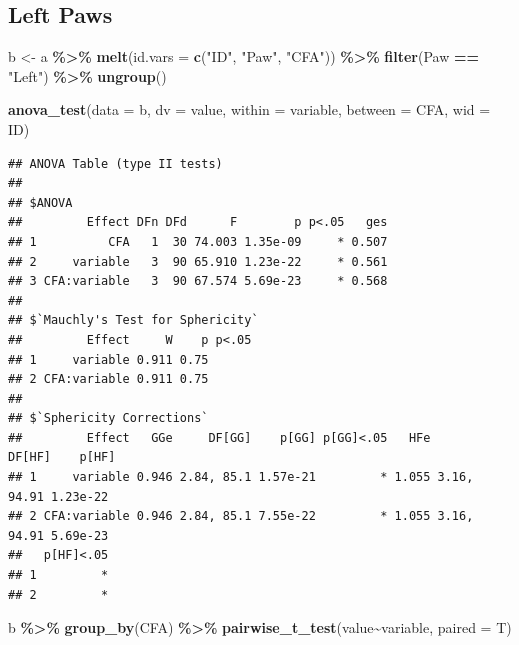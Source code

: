 \documentclass[
]{book}
\newenvironment{Shaded}{\begin{snugshade}}{\end{snugshade}}
\newcommand{\AttributeTok}[1]{\textcolor[rgb]{0.13,0.29,0.53}{#1}}
\newcommand{\FunctionTok}[1]{\textcolor[rgb]{0.13,0.29,0.53}{\textbf{#1}}}
\newcommand{\NormalTok}[1]{#1}
\newcommand{\OtherTok}[1]{\textcolor[rgb]{0.56,0.35,0.01}{#1}}
\newcommand{\SpecialCharTok}[1]{\textcolor[rgb]{0.81,0.36,0.00}{\textbf{#1}}}
\newcommand{\StringTok}[1]{\textcolor[rgb]{0.31,0.60,0.02}{#1}}
\begin{document}
\subsection*{Left Paws}\label{left-paws-2}

\begin{Shaded}
\begin{Highlighting}[]
\NormalTok{b }\OtherTok{\textless{}{-}}\NormalTok{ a  }\SpecialCharTok{\%\textgreater{}\%}
  \FunctionTok{melt}\NormalTok{(}\AttributeTok{id.vars =} \FunctionTok{c}\NormalTok{(}\StringTok{"ID"}\NormalTok{, }\StringTok{"Paw"}\NormalTok{, }\StringTok{"CFA"}\NormalTok{)) }\SpecialCharTok{\%\textgreater{}\%}
  \FunctionTok{filter}\NormalTok{(Paw }\SpecialCharTok{==} \StringTok{"Left"}\NormalTok{) }\SpecialCharTok{\%\textgreater{}\%}
  \FunctionTok{ungroup}\NormalTok{() }

\FunctionTok{anova\_test}\NormalTok{(}\AttributeTok{data =}\NormalTok{ b, }\AttributeTok{dv =}\NormalTok{ value, }\AttributeTok{within =}\NormalTok{ variable, }\AttributeTok{between =}\NormalTok{ CFA, }\AttributeTok{wid =}\NormalTok{ ID)}
\end{Highlighting}
\end{Shaded}

\begin{verbatim}
## ANOVA Table (type II tests)
## 
## $ANOVA
##         Effect DFn DFd      F        p p<.05   ges
## 1          CFA   1  30 74.003 1.35e-09     * 0.507
## 2     variable   3  90 65.910 1.23e-22     * 0.561
## 3 CFA:variable   3  90 67.574 5.69e-23     * 0.568
## 
## $`Mauchly's Test for Sphericity`
##         Effect     W    p p<.05
## 1     variable 0.911 0.75      
## 2 CFA:variable 0.911 0.75      
## 
## $`Sphericity Corrections`
##         Effect   GGe     DF[GG]    p[GG] p[GG]<.05   HFe      DF[HF]    p[HF]
## 1     variable 0.946 2.84, 85.1 1.57e-21         * 1.055 3.16, 94.91 1.23e-22
## 2 CFA:variable 0.946 2.84, 85.1 7.55e-22         * 1.055 3.16, 94.91 5.69e-23
##   p[HF]<.05
## 1         *
## 2         *
\end{verbatim}

\begin{Shaded}
\begin{Highlighting}[]
\NormalTok{b }\SpecialCharTok{\%\textgreater{}\%}
  \FunctionTok{group\_by}\NormalTok{(CFA) }\SpecialCharTok{\%\textgreater{}\%}
  \FunctionTok{pairwise\_t\_test}\NormalTok{(value}\SpecialCharTok{\textasciitilde{}}\NormalTok{variable, }\AttributeTok{paired =}\NormalTok{ T)}
\end{Highlighting}
\end{Shaded}
\end{document}
